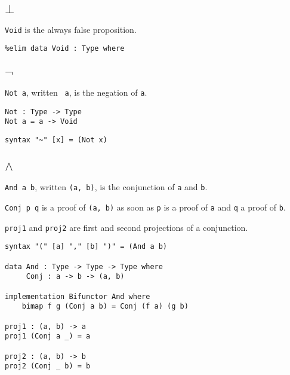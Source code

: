 \documentclass{acm_proc_article-sp}
\begin{document}
\subsection{\texorpdfstring{\(\bot\)}{\textbackslash{}bot}}\label{bot}

\texttt{Void} is the always false proposition.

\begin{verbatim}
%elim data Void : Type where
\end{verbatim}

\subsection{\texorpdfstring{\(\neg\)}{\textbackslash{}neg}}\label{neg}

\texttt{Not a}, written \texttt{~a}, is the
negation of \texttt{a}.

\begin{verbatim}
Not : Type -> Type
Not a = a -> Void
\end{verbatim}

\begin{verbatim}
syntax "~" [x] = (Not x)
\end{verbatim}

\subsection{\texorpdfstring{\(\land\)}{\textbackslash{}land}}\label{land}

\texttt{And a b}, written \texttt{(a, b)}, is
the conjunction of \texttt{a} and \texttt{b}.

\texttt{Conj p q} is a proof of
\texttt{(a, b)} as soon as \texttt{p} is a
proof of \texttt{a} and \texttt{q} a proof of
\texttt{b}.

\texttt{proj1} and \texttt{proj2} are first
and second projections of a conjunction.

\begin{verbatim}
syntax "(" [a] "," [b] ")" = (And a b)

data And : Type -> Type -> Type where
     Conj : a -> b -> (a, b)

implementation Bifunctor And where
    bimap f g (Conj a b) = Conj (f a) (g b)

proj1 : (a, b) -> a
proj1 (Conj a _) = a

proj2 : (a, b) -> b
proj2 (Conj _ b) = b
\end{verbatim}
\end{document}

